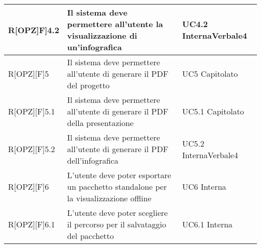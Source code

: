 \begin{table}[H]
\begin{tabular}{|p{}|p{}|p{}|}
			R[OPZ]F]4.2 & Il sistema deve permettere all'utente la visualizzazione
			di un'infografica & UC4.2 Interna\newline Verbale4\\ \midrule 
			R[OPZ][F]5 & Il sistema deve permettere all'utente di generare il PDF del progetto & UC5 Capitolato\\ \midrule 
			R[OPZ][F]5.1 & Il sistema deve permettere all'utente di generare il
			PDF della presentazione & UC5.1 Capitolato\\ \midrule 
			R[OPZ][F]5.2 & Il sistema deve permettere all'utente di generare il
			PDF dell'infografica & UC5.2 Interna\newline Verbale4\\ \midrule 
			R[OPZ][F]6 & L'utente deve poter esportare un pacchetto standalone per la visualizzazione offline & UC6 Interna\\ \midrule 
			R[OPZ][F]6.1 & L'utente deve poter scegliere il percorso per il
			salvataggio del pacchetto & UC6.1 Interna\\ \midrule 
		\end{tabular}
	\end{table}
	\newpage

